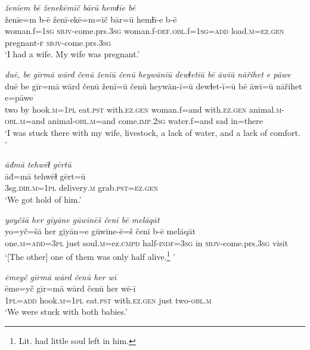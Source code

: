 \ea \label{ZQ.13}
\textit{ženīem bē ženekēmīč bārū hemɫīe bē} \\ 
\gll ženīe=m b-ē ženī-ekē=m=īč bār=ū hemɫī-e b-ē \\ 
 woman.f\textsc{=\textsc{1sg}} \textsc{sbjv-}come.prs\textsc{.3sg} woman.f\textsc{-def}\textsc{.obl}.f\textsc{=\textsc{1sg}}\textsc{=add} load\textsc{.m}\textsc{=ez.gen} pregnant\textsc{-f} \textsc{sbjv-}come.prs\textsc{.3sg} \\ 
\glt `I had a wife. My wife was pregnant.'
\z 
 
\ea \label{ZQ.16}
\textit{duē, be gīrmā wārd čenū ženīū čenū heywānīū dewɫetīū bē āwīū nāřihet e pāwe} \\ 
\gll duē be gīr=mā wārd čenū ženī=ū čenū heywān-ī=ū dewɫet-ī=ū bē āwī=ū nāřihet e=pāwe \\ 
 two by hook\textsc{.m}\textsc{=\textsc{1pl}} eat\textsc{.pst} with\textsc{.ez.gen} woman.f=and with\textsc{.ez.gen} animal\textsc{.m}\textsc{-obl}\textsc{.m}=and animal\textsc{-obl}\textsc{.m}=and come\textsc{.imp}\textsc{.\textsc{2sg}} water.f=and sad in=there \\ 
\glt `I was stuck there with my wife, livestock, a lack of water, and a lack of comfort. '
\z 
 
\ea \label{ZQ.18}
\textit{āđmā tehwēɫ gērtū} \\ 
\gll āđ=mā tehwēɫ gērt=ū \\ 
 3sg\textsc{.dir}\textsc{.m}\textsc{=\textsc{1pl}} delivery\textsc{.m} grab\textsc{.pst}\textsc{=ez.gen} \\ 
\glt `We got hold of him.'
\z 
 
\ea \label{ZQ.19}
\textit{yoyčšā her gīyāne gūwīnēš čenī bē melāqāt} \\ 
\gll yo=yč=šā her gīyān=e gūwīne-ē=š čenī b-ē melāqāt \\ 
 one\textsc{.m}\textsc{=add}\textsc{=3pl} just soul\textsc{.m}=ez\textsc{.cmpd} half\textsc{-indf}\textsc{=3sg} in \textsc{sbjv-}come.prs\textsc{.3sg} visit \\ 
\glt `[The other] one of them was only half alive.\footnote{Lit. had little soul left in him.}    '
\z 
 
\ea \label{ZQ.21}
\textit{ēmeyč gīrmā wārd čenū her wī} \\ 
\gll ēme=yč gīr=mā wārd čenū her wē-ī \\ 
 \textsc{1pl}\textsc{=add} hook\textsc{.m}\textsc{=\textsc{1pl}} eat\textsc{.pst} with\textsc{.ez.gen} just two\textsc{-obl}\textsc{.m} \\ 
\glt `We were stuck with both babies.'
\z 
 
